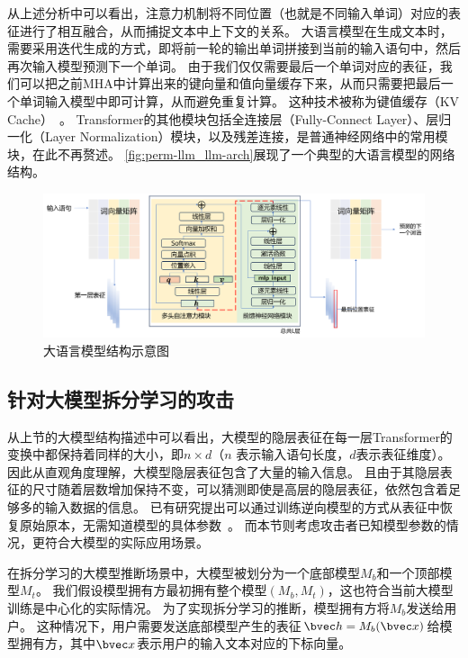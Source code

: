 从上述分析中可以看出，注意力机制将不同位置（也就是不同输入单词）对应的表征进行了相互融合，从而捕捉文本中上下文的关系。
%
大语言模型在生成文本时，需要采用迭代生成的方式，即将前一轮的输出单词拼接到当前的输入语句中，然后再次输入模型预测下一个单词。
%
由于我们仅仅需要最后一个单词对应的表征，我们可以把之前MHA中计算出来的键向量和值向量缓存下来，从而只需要把最后一个单词输入模型中即可计算，从而避免重复计算。
%
这种技术被称为键值缓存（KV Cache）~\cite{pope_2023_efficiently_kv_cache}。
%
Transformer的其他模块包括全连接层（Fully-Connect Layer）、层归一化（Layer Normalization）模块，以及残差连接，是普通神经网络中的常用模块，在此不再赘述。
%
\autoref{fig:perm-llm_llm-arch}展现了一个典型的大语言模型的网络结构。

\begin{figure}[htbp]
    \centering
    \includegraphics[width=\linewidth]{Z_Resources/perm-llm_llm-architecture.png}
    \caption{大语言模型结构示意图}
    \label{fig:perm-llm_llm-arch}
\end{figure}


\subsection{针对大模型拆分学习的攻击}
从上节的大模型结构描述中可以看出，大模型的隐层表征在每一层Transformer的变换中都保持着同样的大小，即$n \times d$（$n$ 表示输入语句长度，$d$表示表征维度）。
%
因此从直观角度理解，大模型隐层表征包含了大量的输入信息。
且由于其隐层表征的尺寸随着层数增加保持不变，可以猜测即使是高层的隐层表征，依然包含着足够多的输入数据的信息。
%
已有研究提出可以通过训练逆向模型的方式从表征中恢复原始原本，无需知道模型的具体参数~\cite{morris2023embedding_almost}。
而本节则考虑攻击者已知模型参数的情况，更符合大模型的实际应用场景。


在拆分学习的大模型推断场景中，大模型被划分为一个底部模型$M_b$和一个顶部模型$M_t$。
%
我们假设模型拥有方最初拥有整个模型$(M_b, M_t)$，这也符合当前大模型训练是中心化的实际情况。
%
为了实现拆分学习的推断，模型拥有方将$M_b$发送给用户。
%
这种情况下，用户需要发送底部模型产生的表征$\bvec h = M_b(\bvec x)$给模型拥有方，其中$\bvec x$表示用户的输入文本对应的下标向量。

